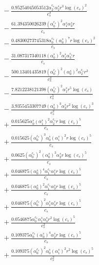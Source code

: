 \documentclass[10pt]{article}
\begin{document}
\begin{align*}
&{}  - \frac{0.95254045053512 \alpha_{2}^{c_s} \alpha_{2}^s r^{3} \log{\left(c_{s} \right)}^{2}}{c_{s}^{3}} \\
&{}  - \frac{61.394350026239 \left(\alpha_{0}^{c_s}\right)^{2} \alpha_{1}^s \alpha_{3}^s r}{c_{s}} \\
&{}  - \frac{0.48300273745318 \alpha_{0}^{c_s} \left(\alpha_{0}^s\right)^{7} r \log{\left(c_{s} \right)}^{2}}{c_{s}} \\
&{}  - \frac{31.087317340118 \left(\alpha_{0}^s\right)^{2} \alpha_{1}^s \alpha_{3}^{c_s} r}{c_{s}} \\
&{}  - \frac{500.13401435819 \left(\alpha_{0}^{c_s}\right)^{2} \left(\alpha_{0}^s\right)^{2} \alpha_{2}^{c_s} r^{2}}{c_{s}^{2}} \\
&{}  - \frac{7.8212238121398 \left(\alpha_{0}^{c_s}\right)^{2} \alpha_{1}^s r^{5} \log{\left(c_{s} \right)}}{c_{s}^{5}} \\
&{}  - \frac{3.9355453307749 \left(\alpha_{0}^s\right)^{3} \alpha_{3}^s r^{2} \log{\left(c_{s} \right)}^{3}}{c_{s}^{2}} \\
&{}  + \frac{0.015625 \alpha_{0}^s \left(\alpha_{1}^s\right)^{2} \alpha_{2}^{c_s} r \log{\left(c_{s} \right)}^{5}}{c_{s}} \\
&{}  + \frac{0.015625 \left(\alpha_{0}^{c_s}\right)^{3} \alpha_{0}^s \left(\alpha_{1}^s\right)^{2} r \log{\left(c_{s} \right)}^{5}}{c_{s}} \\
&{}  + \frac{0.0625 \left(\alpha_{0}^{c_s}\right)^{2} \left(\alpha_{0}^s\right)^{3} \alpha_{2}^s r \log{\left(c_{s} \right)}^{5}}{c_{s}} \\
&{}  + \frac{0.046875 \left(\alpha_{0}^s\right)^{4} \alpha_{1}^{c_s} \alpha_{1}^s r \log{\left(c_{s} \right)}^{5}}{c_{s}} \\
&{}  + \frac{0.046875 \left(\alpha_{0}^s\right)^{2} \alpha_{1}^{c_s} \alpha_{3}^s r \log{\left(c_{s} \right)}^{5}}{c_{s}} \\
&{}  + \frac{0.046875 \left(\alpha_{0}^{c_s}\right)^{2} \alpha_{1}^s \alpha_{3}^s r \log{\left(c_{s} \right)}^{5}}{c_{s}} \\
&{}  + \frac{0.0546875 \alpha_{0}^{c_s} \alpha_{1}^s \alpha_{3}^s r^{2} \log{\left(c_{s} \right)}^{5}}{c_{s}^{2}} \\
&{}  + \frac{0.109375 \alpha_{0}^{c_s} \left(\alpha_{0}^s\right)^{4} \alpha_{2}^s r \log{\left(c_{s} \right)}^{5}}{c_{s}} \\
&{}  + \frac{0.109375 \left(\alpha_{0}^{c_s}\right)^{2} \alpha_{0}^s \left(\alpha_{1}^s\right)^{2} r^{2} \log{\left(c_{s} \right)}^{5}}{c_{s}^{2}} \\

\end{align*}
\end{document}
